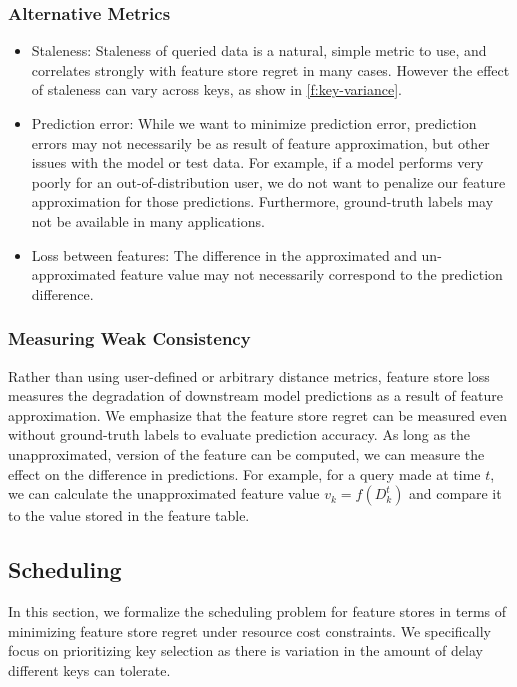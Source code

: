 \subsubsection{Alternative Metrics}
\begin{itemize}
    \item Staleness: Staleness of queried data is a natural, simple metric to use, and correlates strongly with feature store regret in many cases. However the effect of staleness can vary across keys, as show in \ref{f:key-variance}.
    \item Prediction error: While we want to minimize prediction error, prediction errors may not necessarily be as result of feature approximation, but other issues with the model or test data. For example, if a model performs very poorly for an out-of-distribution user, we do not want to penalize our feature approximation for those predictions. Furthermore, ground-truth labels may not be available in many applications. 
    \item Loss between features: The difference in the approximated and un-approximated feature value may not necessarily correspond to the prediction difference. 
\end{itemize}

\subsubsection{Measuring Weak Consistency}
Rather than using user-defined or arbitrary distance metrics, feature store loss measures the degradation of downstream model predictions as a result of feature approximation. We emphasize that the feature store regret can be measured even without ground-truth labels to evaluate prediction accuracy. As long as the unapproximated, version of the feature can be computed, we can measure the effect on the difference in predictions. For example, for a query made at time $t$, we can calculate the unapproximated feature value $v_k = f(D^t_k)$ and compare it to the value stored in the feature table. 



\subsection{Scheduling}
In this section, we formalize the scheduling problem for feature stores in terms of minimizing feature store regret under resource cost constraints. We specifically focus on prioritizing key selection as there is variation in the amount of delay different keys can tolerate. 

